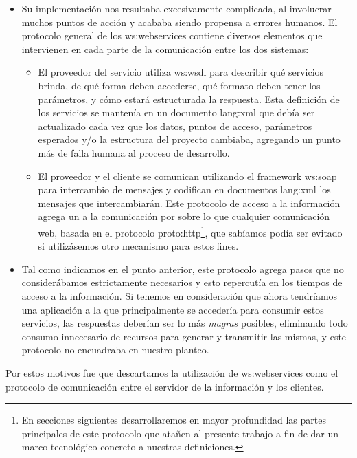 \begin{itemize}
  \item Su implementación nos resultaba excesivamente complicada, al involucrar muchos puntos de acción y acababa siendo propensa a errores humanos. El protocolo general de los \glspl{ws:webservice} contiene diversos elementos que intervienen en cada parte de la comunicación entre los dos sistemas:
  \begin{itemize}
    \item El proveedor del servicio utiliza \gls{ws:wsdl} para describir qué servicios brinda, de qué forma deben accederse, qué formato deben tener los parámetros, y cómo estará estructurada la respuesta. Esta definición de los servicios se mantenía en un documento \gls{lang:xml} que debía ser actualizado cada vez que los datos, puntos de acceso, parámetros esperados y/o la estructura del proyecto cambiaba, agregando un punto más de falla humana al proceso de desarrollo.

    \item El proveedor y el cliente se comunican utilizando el framework \gls{ws:soap} para intercambio de mensajes y codifican en documentos \gls{lang:xml} los mensajes que intercambiarán. Este protocolo de acceso a la información agrega un  a la comunicación por sobre lo que cualquier comunicación web, basada en el protocolo \gls{proto:http}\footnote{En secciones siguientes desarrollaremos en mayor profundidad las partes principales de este protocolo que atañen al presente trabajo a fin de dar un marco tecnológico concreto a nuestras definiciones.}, que sabíamos podía ser evitado si utilizásemos otro mecanismo para estos fines.
  \end{itemize}

  \item Tal como indicamos en el punto anterior, este protocolo agrega pasos que no considerábamos estrictamente necesarios y esto repercutía en los tiempos de acceso a la información. Si tenemos en consideración que ahora tendríamos una aplicación a la que principalmente se accedería para consumir estos servicios, las respuestas deberían ser lo más \textit{magras} posibles, eliminando todo consumo innecesario de recursos para generar y transmitir las mismas, y este protocolo no encuadraba en nuestro planteo.
\end{itemize}

Por estos motivos fue que descartamos la utilización de \glspl{ws:webservice} como el protocolo de comunicación entre el servidor de la información y los clientes.

